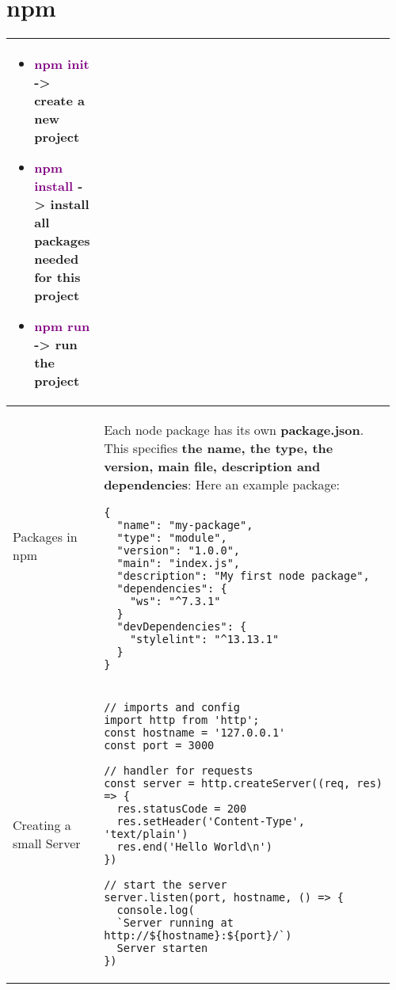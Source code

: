\documentclass[main.tex,fontsize=8pt,paper=a4,paper=portrait,DIV=calc,]{scrartcl}
\begin{document}
\begin{table}[ht!]
\section{npm}
\begin{tabular}{|m{0.2\linewidth}|m{0.755\linewidth}|}
\hline
\begin{itemize}
\item \textcolor{purple}{npm init} -> create a new project
\item \textcolor{purple}{npm install} -> install all packages needed for this project
\item \textcolor{purple}{npm run} -> run the project
\vspace{-3mm}
\end{itemize}\\ 
\hline
Packages in npm & 
Each node package has its own \textbf{package.json}.\newline
This specifies \textbf{the name, the type, the version, main file, description and dependencies}:\newline
Here an example package:\newline
\begin{lstlisting}
{
  "name": "my-package",
  "type": "module",
  "version": "1.0.0",
  "main": "index.js",
  "description": "My first node package",
  "dependencies": {
    "ws": "^7.3.1"
  }
  "devDependencies": {
    "stylelint": "^13.13.1"
  }
}
\end{lstlisting}\\
\hline
Creating a small Server & 
\begin{lstlisting}
// imports and config
import http from 'http';
const hostname = '127.0.0.1'
const port = 3000

// handler for requests
const server = http.createServer((req, res) => {
  res.statusCode = 200
  res.setHeader('Content-Type', 'text/plain')
  res.end('Hello World\n')
})

// start the server
server.listen(port, hostname, () => {
  console.log(
  `Server running at http://${hostname}:${port}/`)
  Server starten
})
\end{lstlisting}\\
\hline
\end{tabular}
\end{table}
\pagebreak
\end{document}
